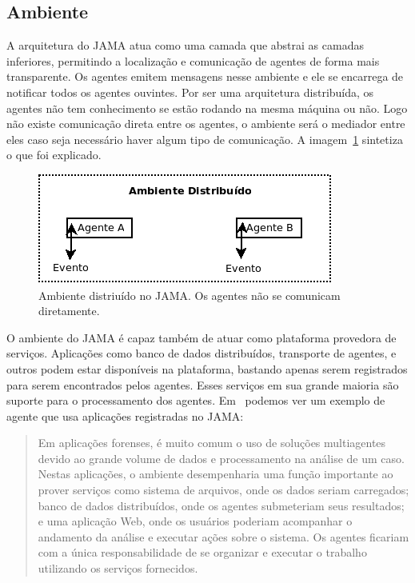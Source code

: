 \subsection{Ambiente}

A arquitetura do JAMA atua como uma camada que abstrai as camadas inferiores, permitindo a localização e comunicação de agentes de forma mais transparente. Os agentes emitem mensagens nesse ambiente e ele se encarrega de notificar todos os agentes ouvintes. Por ser uma arquitetura distribuída, os agentes não tem conhecimento se estão rodando na mesma máquina ou não. Logo não existe comunicação direta entre os agentes, o ambiente será o mediador entre eles caso seja necessário haver algum tipo de comunicação. A imagem~\ref{fig:ambiente} sintetiza o que foi explicado.

\begin{figure}
	\centering
	\includegraphics[scale=0.75]{images/ambiente.png}
	\caption{Ambiente distriuído no JAMA. Os agentes não se comunicam diretamente.}
	\label{fig:ambiente}
\end{figure}

O ambiente do JAMA é capaz também de atuar como plataforma provedora de serviços. Aplicações como banco de dados distribuídos, transporte de agentes, e outros podem estar disponíveis na plataforma, bastando apenas serem registrados para serem encontrados pelos agentes. Esses serviços em sua grande maioria são suporte para o processamento dos agentes. Em~\cite{parise11} podemos ver um exemplo de agente que usa aplicações registradas no JAMA:

\begin{quote}
Em aplicações forenses, é muito comum o uso de soluções multiagentes devido ao grande volume de dados e processamento na análise de um caso. Nestas aplicações, o ambiente desempenharia uma função importante ao prover serviços como sistema de arquivos, onde os dados seriam carregados; banco de dados distribuídos, onde os agentes submeteriam seus resultados; e uma aplicação Web, onde os usuários poderiam acompanhar o andamento da análise e executar ações sobre o sistema. Os agentes ficariam com a única responsabilidade de se organizar e executar o trabalho utilizando os serviços fornecidos.
\end{quote}

